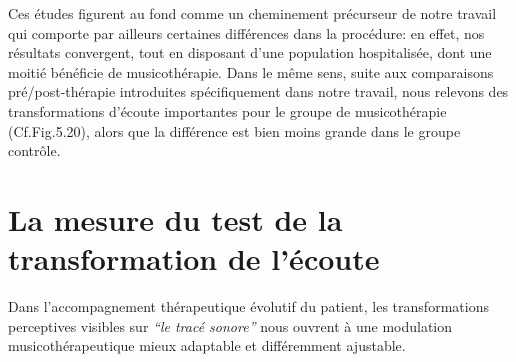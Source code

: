 Ces études figurent au fond comme un cheminement précurseur de notre
travail qui comporte par ailleurs certaines différences dans la
 procédure:  %
 en effet, nos résultats convergent, tout en disposant d'une population hospitalisée,
dont une moitié bénéficie de
musicothérapie.
Dans le même sens, suite aux comparaisons
pré/post-thérapie introduites spécifiquement dans notre travail, nous relevons des transformations d'écoute 
importantes pour le groupe de musicothérapie (Cf.Fig.5.20),  alors que
la différence est bien moins grande dans le groupe contrôle.







 
\section{La mesure du test de la trans\-for\-ma\-tion de l'écoute}
Dans l'accompagnement thérapeutique évolutif du patient, 
 les transformations perceptives visibles sur 
\textit{``le tracé sonore''} nous ouvrent à une modulation
musicothérapeutique mieux adaptable et différemment ajustable.

 
